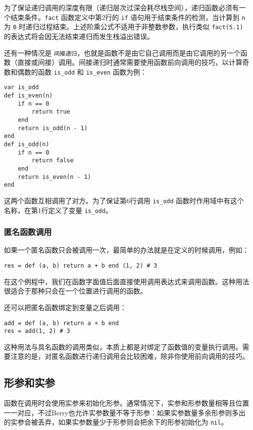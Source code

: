 为了保证递归调用的深度有限（递归层次过深会耗尽栈空间），递归函数必须有一个结束条件。\texttt{fact} 函数定义中第2行的 \texttt{if} 语句用于结束条件的检测，当计算到 \texttt{n} 为 \texttt{0} 时递归过程结束。上述阶乘公式不适用于非整数参数，执行类似 \texttt{fact(5.1)} 的表达式将会因无法结束递归而发生栈溢出错误。

还有一种情况是 \texttt{间接递归}，也就是函数不是由它自己调用而是由它调用的另一个函数（直接或间接）调用。间接递归时通常需要使用函数前向调用的技巧，以计算奇数和偶数的函数 \texttt{is\_odd} 和 \texttt{is\_even} 函数为例：
\begin{lstlisting}[language=berry]
var is_odd
def is_even(n)
    if n == 0
        return true
    end
    return is_odd(n - 1) 
end
def is_odd(n)
    if n == 0
        return false
    end
    return is_even(n - 1) 
end
\end{lstlisting}
这两个函数互相调用了对方。为了保证第6行调用 \texttt{is\_odd} 函数时作用域中有这个名称，在第1行定义了变量 \texttt{is\_odd}。

\subsubsection{匿名函数调用}

如果一个匿名函数只会被调用一次，最简单的办法就是在定义的时候调用，例如：
\begin{lstlisting}[language=berry, numbers=none]
res = def (a, b) return a + b end (1, 2) # 3
\end{lstlisting}
在这个例程中，我们在函数字面值后面直接使用调用表达式来调用函数。这种用法很适合于那种只会在一个位置进行调用的函数。

还可以把匿名函数绑定到变量之后调用：
\begin{lstlisting}[language=berry, numbers=none]
add = def (a, b) return a + b end
res = add(1, 2) # 3
\end{lstlisting}
这种用法与具名函数的调用类似，本质上都是对绑定了函数值的变量执行调用。需要注意的是，对匿名函数进行递归调用会比较困难，除非你使用前向调用的技巧。

\subsection{形参和实参}

函数在调用时会使用实参来初始化形参。通常情况下，实参和形参数量相等且位置一一对应，不过Berry也允许实参数量不等于形参：如果实参数量多余形参则多出的实参会被丢弃，如果实参数量少于形参则会把余下的形参初始化为 \texttt{nil}。

